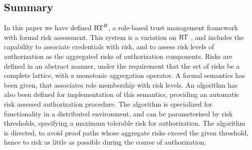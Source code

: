 \subsection{Summary}

In this paper we have defined $\text{RT}^R$, a role-based trust management
framework with formal risk assessment.  This system is a variation on
$\text{RT}$ \cite{Li:2003-04}, and includes the capability to associate
credentials with risk, and to assess risk levels of authorization as
the aggregated risks of authorization components.  Risks are defined
in an abstract manner, under the requirement that the set of risks be
a complete lattice, with a monotonic aggregation operator.  A formal
semantics has been given, that associates role membership with risk
levels.  An algorithm has also been defined for implementation of this
semantics, providing an automatic risk assessed authorization
procedure.  The algorithm is specialized for functionality in a
distributed environment, and can be parameterized by risk thresholds,
specifying a maximum tolerable risk for authorization.  The algorithm
is directed, to avoid proof paths whose aggregate risks exceed the
given threshold, hence to risk as little as possible during the course
of authorization.
